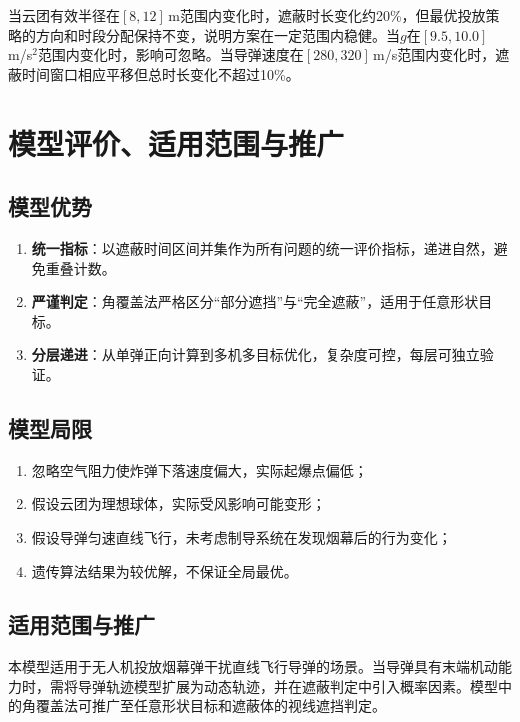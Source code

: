 \documentclass[a4paper]{ctexart}
\begin{document}
当云团有效半径在$[8, 12]$\,m范围内变化时，遮蔽时长变化约20\%，但最优投放策略的方向和时段分配保持不变，说明方案在一定范围内稳健。当$g$在$[9.5, 10.0]$\,m/s$^2$范围内变化时，影响可忽略。当导弹速度在$[280, 320]$\,m/s范围内变化时，遮蔽时间窗口相应平移但总时长变化不超过10\%。

\section{模型评价、适用范围与推广}

\subsection{模型优势}

\begin{enumerate}[label=（\arabic*）]
  \item \textbf{统一指标}：以遮蔽时间区间并集作为所有问题的统一评价指标，递进自然，避免重叠计数。
  \item \textbf{严谨判定}：角覆盖法严格区分``部分遮挡''与``完全遮蔽''，适用于任意形状目标。
  \item \textbf{分层递进}：从单弹正向计算到多机多目标优化，复杂度可控，每层可独立验证。
\end{enumerate}

\subsection{模型局限}

\begin{enumerate}[label=（\arabic*）]
  \item 忽略空气阻力使炸弹下落速度偏大，实际起爆点偏低；
  \item 假设云团为理想球体，实际受风影响可能变形；
  \item 假设导弹匀速直线飞行，未考虑制导系统在发现烟幕后的行为变化；
  \item 遗传算法结果为较优解，不保证全局最优。
\end{enumerate}

\subsection{适用范围与推广}

本模型适用于无人机投放烟幕弹干扰直线飞行导弹的场景。当导弹具有末端机动能力时，需将导弹轨迹模型扩展为动态轨迹，并在遮蔽判定中引入概率因素。模型中的角覆盖法可推广至任意形状目标和遮蔽体的视线遮挡判定。
\end{document}
